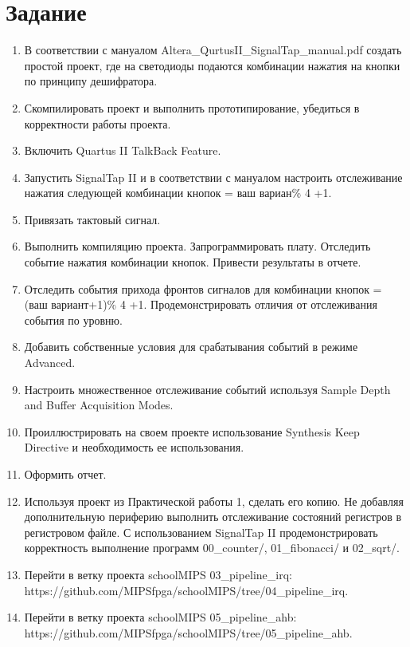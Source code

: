 \documentclass[a4paper,14pt]{article}
\begin{document}
	
	\tableofcontents
	\pagebreak
	\section{Задание}
	
	\begin{enumerate}
		\item В соответствии с мануалом Altera\_QurtusII\_SignalTap\_manual.pdf создать простой проект, где на светодиоды подаются комбинации нажатия на кнопки по принципу дешифратора.
		
		\item Скомпилировать проект и выполнить прототипирование, убедиться в корректности работы проекта.
		
		\item Включить Quartus II TalkBack Feature.
		
		\item Запустить SignalTap II и в соответствии с мануалом настроить отслеживание нажатия следующей комбинации кнопок = ваш вариан\% 4 +1.
		
		\item Привязать тактовый сигнал.
		
		\item Выполнить компиляцию проекта. Запрограммировать плату. Отследить событие нажатия комбинации кнопок. Привести результаты в отчете.
		
		\item Отследить события прихода фронтов сигналов для комбинации кнопок = (ваш вариант+1)\% 4 +1. Продемонстрировать отличия от отслеживания события по уровню.
		
		\item Добавить собственные условия для срабатывания событий в режиме Advanced.
			
		\item Настроить множественное отслеживание событий используя Sample Depth and Buffer Acquisition Modes.
		
		\item Проиллюстрировать на своем проекте использование Synthesis Keep Directive и необходимость ее использования.
		
		\item Оформить отчет.
		
		\item Используя проект из Практической работы 1, сделать его копию.
		Не добавляя дополнительную периферию выполнить отслеживание состояний регистров в регистровом файле.
		С использованием SignalTap II продемонстрировать корректность выполнение программ 00\_counter/, 01\_fibonacci/ и 02\_sqrt/.
		
		\item Перейти в ветку проекта schoolMIPS 03\_pipeline\_irq: https://github.com/MIPSfpga/schoolMIPS/tree/04\_pipeline\_irq.
		
		\item Перейти в ветку проекта schoolMIPS 05\_pipeline\_ahb: https://github.com/MIPSfpga/schoolMIPS/tree/05\_pipeline\_ahb.
		
	\end{enumerate}
\end{document}
